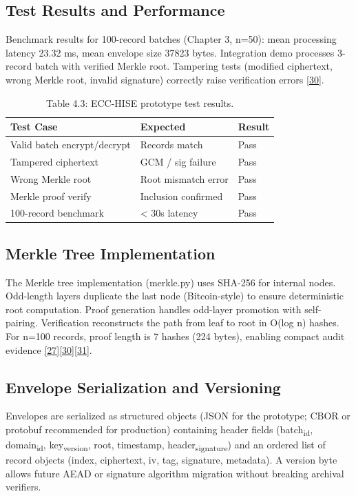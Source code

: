 \subsection{Test Results and Performance}

\indent Benchmark results for 100-record batches (Chapter 3, n=50): mean processing latency 23.32 ms, mean envelope size 37823 bytes. Integration demo processes 3-record batch with verified Merkle root. Tampering tests (modified ciphertext, wrong Merkle root, invalid signature) correctly raise verification errors \hyperref[ref:30]{[30]}.

\begin{table}[htbp]
\centering
\begin{tabular}{lll}
\toprule
Test Case & Expected & Result \\
\midrule
Valid batch encrypt/decrypt & Records match & Pass \\
Tampered ciphertext & GCM / sig failure & Pass \\
Wrong Merkle root & Root mismatch error & Pass \\
Merkle proof verify & Inclusion confirmed & Pass \\
100-record benchmark & < 30s latency & Pass \\
\bottomrule
\end{tabular}
\caption{Table 4.3: ECC-HISE prototype test results.}\label{tbl:4.3}
\end{table}
\subsection{Merkle Tree Implementation}

\indent The Merkle tree implementation (merkle.py) uses SHA-256 for internal nodes. Odd-length layers duplicate the last node (Bitcoin-style) to ensure deterministic root computation. Proof generation handles odd-layer promotion with self-pairing. Verification reconstructs the path from leaf to root in O(log n) hashes. For n=100 records, proof length is 7 hashes (224 bytes), enabling compact audit evidence \hyperref[ref:27]{[27]}\hyperref[ref:30]{[30]}\hyperref[ref:31]{[31]}.

\subsection{Envelope Serialization and Versioning}

\indent Envelopes are serialized as structured objects (JSON for the prototype; CBOR or protobuf recommended for production) containing header fields (batch\textsubscript{id}, domain\textsubscript{id}, key\textsubscript{version}, root, timestamp, header\textsubscript{signature}) and an ordered list of record objects (index, ciphertext, iv, tag, signature, metadata). A version byte allows future AEAD or signature algorithm migration without breaking archival verifiers.

